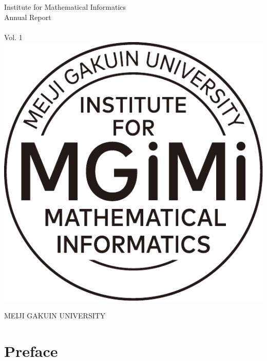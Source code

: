 \documentclass[12pt,dvipdfmx]{report}
\begin{document}
%
%
\setcounter{page}{0}
\thispagestyle{empty}

\vspace*{1.5cm}

\begin{center}
\Huge{\sffamily Institute for Mathematical Informatics}\\
\vspace{1.5cm}
\Huge{\sffamily Annual Report}\\
\vspace{0.5cm}
\Huge{}\\
\vspace{0.5cm}
\Huge{\sffamily Vol. 1}\\

\vfill
\includegraphics[scale=0.7]{circle_logo.pdf}
\vfill

\Huge{M}\Large{EIJI}
\Huge{G}\Large{AKUIN}
\Huge{U}\Large{NIVERSITY}
\end{center}

\vspace{1cm}

\newpage

%
%
\chapter*{Preface}
\end{document}
